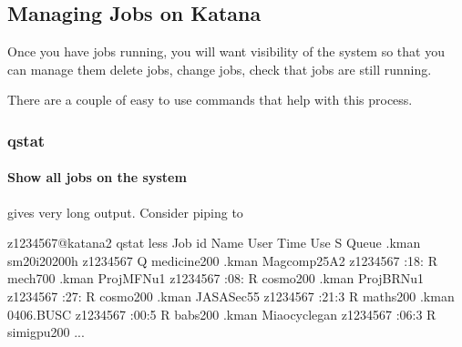 \documentclass[letterpaper,10pt,english]{sphinxmanual}
\begin{document}
\subsection{Managing Jobs on Katana}
\label{\detokenize{using_katana/running_jobs:managing-jobs-on-katana}}\label{\detokenize{using_katana/running_jobs:managing-jobs}}
Once you have jobs running, you will want visibility of the system so that you can manage them \sphinxhyphen{} delete jobs, change jobs, check that jobs are still running.

There are a couple of easy to use commands that help with this process.


\subsubsection{qstat}
\label{\detokenize{using_katana/running_jobs:qstat}}

\paragraph{Show all jobs on the system}
\label{\detokenize{using_katana/running_jobs:show-all-jobs-on-the-system}}\label{\detokenize{using_katana/running_jobs:more-info-from-pbs}}
 gives very long output. Consider piping to 

\begin{sphinxVerbatim}[commandchars=\\\{\}]
\PYG{o}{[}z1234567@katana2 \PYGZti{}\PYG{o}{]}\PYGZdl{} qstat  less
Job id            Name             User              Time Use S Queue
\PYGZhy{}\PYGZhy{}\PYGZhy{}\PYGZhy{}\PYGZhy{}\PYGZhy{}\PYGZhy{}\PYGZhy{}\PYGZhy{}\PYGZhy{}\PYGZhy{}\PYGZhy{}\PYGZhy{}\PYGZhy{}\PYGZhy{}\PYGZhy{}  \PYGZhy{}\PYGZhy{}\PYGZhy{}\PYGZhy{}\PYGZhy{}\PYGZhy{}\PYGZhy{}\PYGZhy{}\PYGZhy{}\PYGZhy{}\PYGZhy{}\PYGZhy{}\PYGZhy{}\PYGZhy{}\PYGZhy{}\PYGZhy{} \PYGZhy{}\PYGZhy{}\PYGZhy{}\PYGZhy{}\PYGZhy{}\PYGZhy{}\PYGZhy{}\PYGZhy{}\PYGZhy{}\PYGZhy{}\PYGZhy{}\PYGZhy{}\PYGZhy{}\PYGZhy{}\PYGZhy{}\PYGZhy{}  \PYGZhy{}\PYGZhy{}\PYGZhy{}\PYGZhy{}\PYGZhy{}\PYGZhy{}\PYGZhy{}\PYGZhy{} \PYGZhy{} \PYGZhy{}\PYGZhy{}\PYGZhy{}\PYGZhy{}\PYGZhy{}
.kman       s\PYGZhy{}m20\PYGZhy{}i20\PYGZhy{}200h   z1234567                  Q medicine200
.kman       Magcomp25A2      z1234567          :18: R mech700
.kman       Proj\PYGZus{}MF\PYGZus{}Nu1      z1234567          :08: R cosmo200
.kman       Proj\PYGZus{}BR\PYGZus{}Nu1      z1234567          :27: R cosmo200
.kman       JASASec55        z1234567          :21:3 R maths200
.kman       \PYGZhy{}04\PYGZhy{}06.BUSC  z1234567          :00:5 R babs200
.kman       Miaocyclegan     z1234567          :06:3 R simigpu200
...
\end{sphinxVerbatim}
\end{document}
